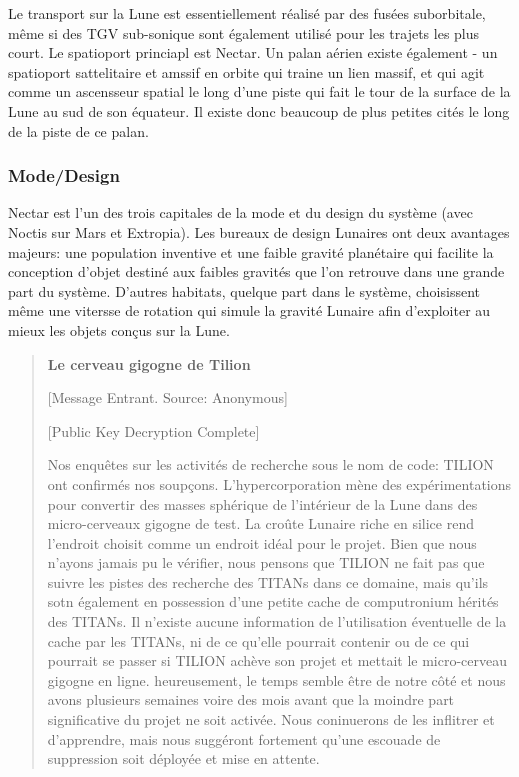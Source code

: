 Le transport sur la Lune est essentiellement réalisé par des fusées suborbitale, même si des TGV sub-sonique sont également utilisé pour les trajets les plus court. Le spatioport princiapl est Nectar. Un palan aérien existe également - un spatioport sattelitaire et amssif en orbite qui traine un lien massif, et qui agit comme un ascensseur spatial le long d'une piste qui fait le tour de la surface de la Lune au sud de son équateur. Il existe donc beaucoup de plus petites cités le long de la piste de ce palan. 

\subsubsection{Mode/Design} \label{sec:fashiondesign} 

Nectar est l'un des trois capitales de la mode et du design du système (avec Noctis sur Mars et Extropia). Les bureaux de design Lunaires ont deux avantages majeurs: une population inventive et une faible gravité planétaire qui facilite la conception d'objet destiné aux faibles gravités que l'on retrouve dans une grande part du système. D'autres habitats, quelque part dans le système, choisissent même une vitersse de rotation qui simule la gravité Lunaire afin d'exploiter au mieux les objets conçus sur la Lune. 

\begin{quotation} \textbf{Le cerveau gigogne de Tilion} 

[Message Entrant. Source: Anonymous] 

[Public Key Decryption Complete] 

Nos enquêtes sur les activités de recherche sous le nom de code: TILION ont confirmés nos soupçons. L'hypercorporation mène des expérimentations pour convertir des masses sphérique de l'intérieur de la Lune dans des micro-cerveaux gigogne de test. La croûte Lunaire riche en silice rend l'endroit choisit comme un endroit idéal pour le projet. Bien que nous n'ayons jamais pu le vérifier, nous pensons que TILION ne fait pas que suivre les pistes des recherche des TITANs dans ce domaine, mais qu'ils sotn également en possession d'une petite cache de computronium hérités des TITANs. Il n'existe aucune information de l'utilisation éventuelle de la cache par les TITANs, ni de ce qu'elle pourrait contenir ou de ce qui pourrait se passer si TILION achève son projet et mettait le micro-cerveau gigogne en ligne. heureusement, le temps semble être de notre côté et nous avons plusieurs semaines voire des mois avant que la moindre part significative du projet ne soit activée. Nous coninuerons de les inflitrer et d'apprendre, mais nous suggéront fortement qu'une escouade de suppression soit déployée et mise en attente. \end{quotation} 

